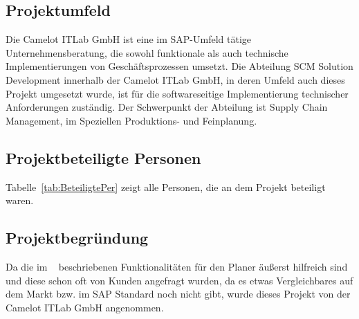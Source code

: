 \subsection{Projektumfeld}
\label{sec:Projektumfeld}
Die Camelot ITLab GmbH ist eine im SAP-Umfeld tätige Unternehmensberatung, die sowohl funktionale als auch technische Implementierungen von Geschäftsprozessen umsetzt.	Die Abteilung SCM Solution Development innerhalb der Camelot ITLab GmbH, in deren Umfeld	auch dieses Projekt umgesetzt wurde, ist für die softwareseitige Implementierung technischer	Anforderungen zuständig. Der Schwerpunkt der Abteilung ist Supply Chain Management, im Speziellen Produktions- und Feinplanung.

\subsection{Projektbeteiligte Personen} 
\label{sec:Projektbeteiligte Personen}
Tabelle~\ref{tab:BeteiligtePer} zeigt alle Personen, die an dem Projekt beteiligt waren.

\subsection{Projektbegründung} 
\label{sec:Projektbegruendung}
Da die im ~ beschriebenen Funktionalitäten für den Planer äußerst hilfreich sind und diese schon oft von Kunden angefragt wurden, da es etwas Vergleichbares auf dem Markt bzw. im SAP Standard noch nicht gibt, wurde dieses Projekt von der Camelot ITLab GmbH angenommen. 